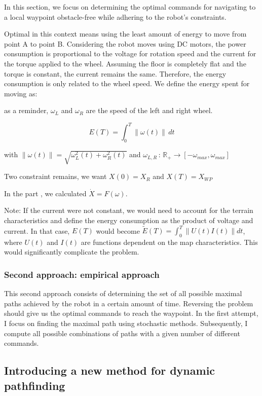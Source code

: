 \documentclass[../main.tex]{subfiles}
\begin{document}
In this section, we focus on determining the optimal commands for navigating to a local waypoint obstacle-free while adhering to the robot's constraints. 

Optimal in this context means using the least amount of energy to move from point A to point B. Considering the robot moves using DC motors, the power consumption is proportional to the voltage for rotation speed and the current for the torque applied to the wheel. Assuming the floor is completely flat and the torque is constant, the current remains the same. Therefore, the energy consumption is only related to the wheel speed. We define the energy spent for moving as:

as a reminder, $\omega_L$ and $\omega_R$ are the speed of the left and right wheel.

$$
\displaystyle E(T) = \int_{0}^{T} \| \omega(t) \| \, dt
$$

with $\displaystyle \| \omega (t) \| = \sqrt{\omega_L^{2}(t) + \omega_R^{2}(t)}$ and  $\omega_{L, R} \,:\, \mathbb{R}_+ \longrightarrow [-\omega_{max}, \omega_{max}]$ 

Two constraint remains, we want $X(0) = X_R$ and $X(T) = X_{WP}$

In the part \figtonum, we calculated $\dot{X} = F(\omega)$.

Note:
If the current were not constant, we would need to account for the terrain characteristics and define the energy consumption as the product of voltage and current. In that case, $E(T)$ would become $\tilde{E}(T) = \int_{0}^{T} \| U(t) I(t) \| dt$, where $U(t)$ and $I(t)$ are functions dependent on the map characteristics. This would significantly complicate the problem. 


\subsubsection{Second approach: empirical approach}

This second approach consists of determining the set of all possible maximal paths achieved by the robot in a certain amount of time. Reversing the problem should give us the optimal commands to reach the waypoint.
In the first attempt, I focus on finding the maximal path using stochastic methods. Subsequently, I compute all possible combinations of paths with a given number of different commands.



\subsection{Introducing a new method for dynamic pathfinding}
\end{document}
